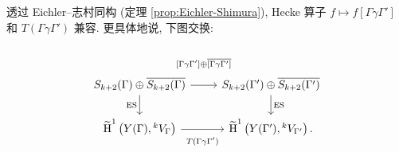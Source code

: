 \begin{proposition}\label{prop:Hecke-cohomology}
	透过 Eichler--志村同构 (定理 \ref{prop:Eichler-Shimura}), Hecke 算子 $f \mapsto f[\Gamma \gamma \Gamma']$ 和 $T(\Gamma\gamma\Gamma')$ 兼容. 更具体地说, 下图交换:
	\[\begin{tikzcd}
		S_{k+2}(\Gamma) \oplus \overline{S_{k+2}(\Gamma)} \arrow[d, "{\mathrm{ES}}"'] \arrow[r, "{[\Gamma\gamma\Gamma'] \oplus \overline{[\Gamma\gamma\Gamma']}}" inner sep=1.5em] & S_{k+2}(\Gamma') \oplus \overline{S_{k+2}(\Gamma')} \arrow[d, "\mathrm{ES}"] \\
		\widetilde{\Hm}^1 \left(Y(\Gamma), {}^k V_\Gamma\right) \arrow[r, "{T(\Gamma\gamma\Gamma')}"' inner sep=0.7em] & \widetilde{\Hm}^1 \left(Y(\Gamma'), {}^k V_{\Gamma'} \right) .
	\end{tikzcd}\]
\end{proposition}
